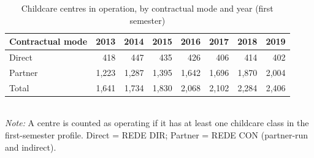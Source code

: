 \begin{table}[htbp]\centering
\caption{Childcare centres in operation, by contractual mode and year (first semester)}
\label{tab:T7a_ceis}
\small
\setlength{\tabcolsep}{4pt}
\begin{tabular}{lrrrrrrr}
\toprule
Contractual mode & 2013 & 2014 & 2015 & 2016 & 2017 & 2018 & 2019 \\
\midrule
Direct & 418 & 447 & 435 & 426 & 406 & 414 & 402 \\
Partner & 1,223 & 1,287 & 1,395 & 1,642 & 1,696 & 1,870 & 2,004 \\
Total & 1,641 & 1,734 & 1,830 & 2,068 & 2,102 & 2,284 & 2,406 \\
\bottomrule
\end{tabular}
\\[3pt]{\footnotesize \textit{Note:} A centre is counted as operating if it has at least one childcare class in the first-semester profile. Direct = REDE DIR; Partner = REDE CON (partner-run and indirect).}
\end{table}
